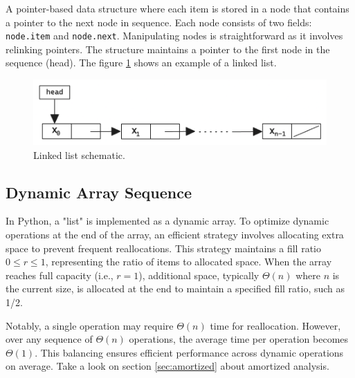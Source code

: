 \documentclass[a4paper,10pt]{article}
\newcommand{\hlt}[1]{\colorbox{color3}{#1}}
\begin{document}
A pointer-based data structure where each item is stored in a node that contains a pointer to the next node in sequence. Each node consists of two fields: \texttt{node.item} and \texttt{node.next}. Manipulating nodes is straightforward as it involves relinking pointers. The structure maintains a pointer to the first node in the sequence (\hlt{head}). The figure \ref{fig:linked_list} shows an example of a linked list. 

\begin{figure}[ht]
\centering
\includegraphics[width=0.5\linewidth]{figures/linked_list.png}
\caption{Linked list schematic.}
\label{fig:linked_list}
\end{figure}

\subsection{Dynamic Array Sequence}

In Python, a "list" is implemented as a dynamic array. To optimize dynamic operations at the end of the array, an efficient strategy involves allocating extra space to \hlt{prevent frequent reallocations}. This strategy maintains a fill ratio \( 0 \leq r \leq 1 \), representing the ratio of items to allocated space. When the array reaches full capacity (i.e., \( r = 1 \)), additional space, typically \( \Theta(n) \) where \( n \) is the current size, is allocated at the end to maintain a specified fill ratio, such as 1/2.

Notably, a single operation may require \( \Theta(n) \) time for reallocation. However, over any sequence of \( \Theta(n) \) operations, the average time per operation becomes \( \Theta(1) \). This balancing ensures efficient performance across dynamic operations on average. Take a look on section \ref{sec:amortized} about amortized analysis. 
 
\end{document}
